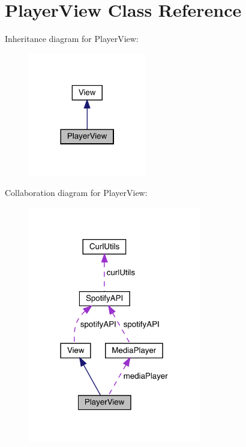 \hypertarget{class_player_view}{}\section{Player\+View Class Reference}
\label{class_player_view}


Inheritance diagram for Player\+View\+:
\nopagebreak
\begin{figure}[H]
\begin{center}
\leavevmode
\includegraphics[width=146pt]{class_player_view__inherit__graph}
\end{center}
\end{figure}


Collaboration diagram for Player\+View\+:
\nopagebreak
\begin{figure}[H]
\begin{center}
\leavevmode
\includegraphics[width=214pt]{class_player_view__coll__graph}
\end{center}
\end{figure}

